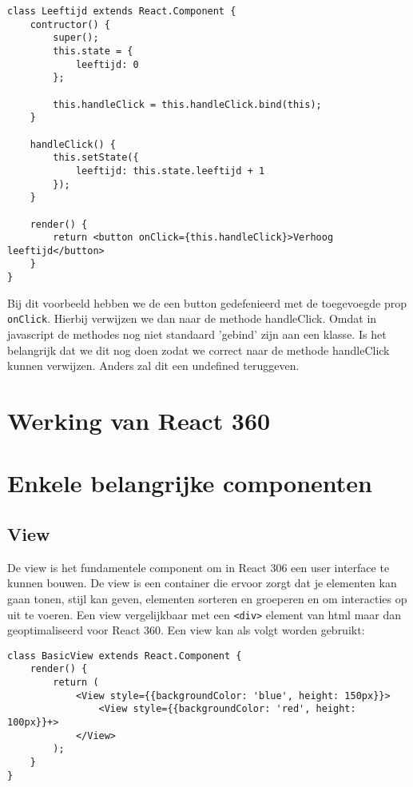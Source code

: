\begin{lstlisting}[frame=single, caption=Voorbeeld van een vent afhandelen.]
class Leeftijd extends React.Component {
	contructor() {
		super();
		this.state = {
			leeftijd: 0
		};
		
		this.handleClick = this.handleClick.bind(this);
	}
	
	handleClick() {
		this.setState({
			leeftijd: this.state.leeftijd + 1
		});
	}

	render() {
		return <button onClick={this.handleClick}>Verhoog leeftijd</button>
	}
}
\end{lstlisting}

Bij dit voorbeeld hebben we de een button gedefenieerd met de toegevoegde prop \lstinline[basicstyle=\ttfamily\color{red}]|onClick|. Hierbij verwijzen we dan naar de methode handleClick. Omdat in javascript de methodes nog niet standaard 'gebind' zijn aan een klasse. Is het belangrijk dat we dit nog doen zodat we correct naar de methode handleClick kunnen verwijzen. Anders zal dit een undefined teruggeven.

\section{Werking van React 360}
\label{sec:werking-react360}

\section{Enkele belangrijke componenten}
\label{sec:reactvr-componenten}

\subsection{View}
\label{subsec:view}
De view is het fundamentele component om in React 306 een user interface te kunnen bouwen. De view is een container die ervoor zorgt dat je elementen kan gaan tonen, stijl kan geven, elementen sorteren en groeperen en om interacties op uit te voeren. Een view vergelijkbaar met een \lstinline[basicstyle=\ttfamily\color{red}]|<div>| element van html maar dan geoptimaliseerd voor React 360. Een view kan als volgt worden gebruikt:

\begin{lstlisting}[frame=single, caption=Een component die een View teruggeeft.]
class BasicView extends React.Component {
	render() {
		return (
			<View style={{backgroundColor: 'blue', height: 150px}}>
				<View style={{backgroundColor: 'red', height: 100px}}+>
			</View>
		);
	}
}
\end{lstlisting}

